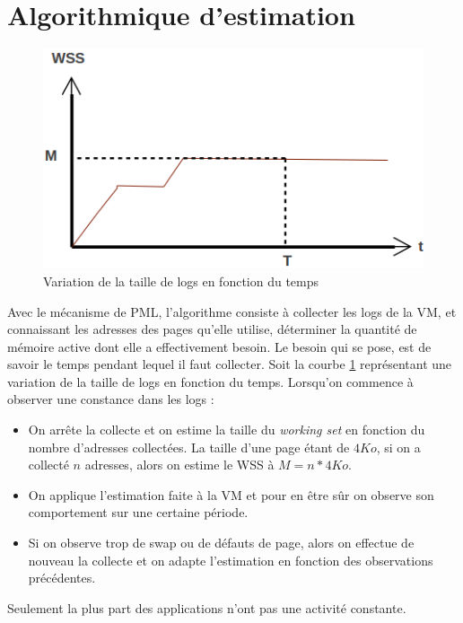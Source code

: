 \section{Algorithmique d'estimation}
\label{section:contrib_algo}
\begin{figure}[H]
    \centering
    \includegraphics[scale=.6]{chapters/3/fig3/courbe_wss_1}
    \caption{Variation de la taille de logs en fonction du temps}
    \label{fig:courbe_wss_cst}
\end{figure}
Avec le mécanisme de PML, l'algorithme consiste à collecter les logs de la VM, et connaissant les adresses des pages qu'elle utilise, déterminer la quantité de mémoire active dont elle a effectivement besoin. Le besoin qui se pose, est de savoir le temps pendant lequel il faut collecter. Soit la courbe \ref{fig:courbe_wss_cst} représentant une variation de la taille de logs en fonction du temps. Lorsqu'on commence à observer une constance dans les logs : 
\begin{itemize}
    \item On arrête la collecte et on estime la taille du \textit{working set} en fonction du nombre d'adresses collectées. La taille d'une page étant de $4Ko$, si on a collecté $n$ adresses, alors on estime le WSS à $M = n*4 Ko$.
    \item On applique l'estimation faite à la VM et pour en être sûr on observe son comportement sur une certaine période.
    \item Si on observe trop de swap ou de défauts de page, alors on effectue de nouveau la collecte et on adapte l'estimation en fonction des observations précédentes.
\end{itemize}

\noindent Seulement la plus part des applications n'ont pas une activité constante.

